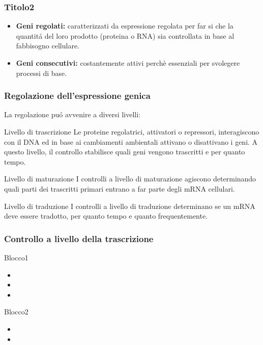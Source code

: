 \documentclass[hyperref={pdfpagelabels=false}]{beamer}
\begin{document}
\begin{frame}\frametitle{Titolo2}
\begin{itemize}
\item \textbf{Geni regolati:}  caratterizzati da espressione regolata per far si che la quantit\'a del loro prodotto (proteina o RNA) sia controllata in base al fabbisogno cellulare.
\item \textbf{Geni consecutivi:} costantemente attivi perchè essenziali per svolegere processi di base.
\end{itemize}
\end{frame}


\begin{frame}\frametitle{Regolazione dell'espressione genica}
La regolazione pu\'o avvenire a diversi livelli:
\begin{block}{Livello di trascrizione}
Le proteine regolatrici, attivatori o repressori, interagiscono con il DNA ed in base ai cambiamenti ambientali attivano o disattivano i geni. A questo livello, il controllo stabilisce quali geni vengono trascritti e per quanto tempo.
\end{block}
\begin{block}{Livello di maturazione}
I controlli a livello di maturazione agiscono determinando quali parti dei trascritti primari entrano a far parte degli mRNA cellulari.
\end{block}
\begin{block}{Livello di traduzione}
I controlli a livello di traduzione determinano se un mRNA deve essere tradotto, per quanto tempo e quanto frequentemente.
\end{block}
\end{frame}


\begin{frame} \frametitle{Controllo a livello della trascrizione}
\begin{block}{Blocco1}
\begin{itemize}
\item 
\item 
\item 
\end{itemize}
\end{block}
\begin{exampleblock}{Blocco2}
\begin{itemize}
\item 
\item 
\end{itemize}
\end{exampleblock}
\bigskip
\bigskip
\bigskip
\end{frame}
\end{document}
